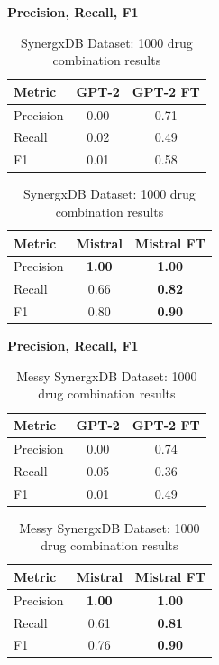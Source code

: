 \documentclass[11pt]{article}
\begin{document}
\begin{table}[ht]
\centering
\caption{SynergxDB Dataset: 1000 drug combination results}
\label{table:result}
\textbf{Precision, Recall, F1}
\par\medskip %
\begin{tabular}{|l|c|c|}
\hline
\textbf{Metric} & \textbf{GPT-2} & \textbf{GPT-2 FT} \\
\hline
Precision & 0.00 & 0.71 \\
Recall & 0.02 & 0.49 \\
F1 & 0.01 & 0.58 \\
\hline
\end{tabular}
\par\medskip %
\begin{tabular}{|l|c|c|}
\hline
\textbf{Metric} & \textbf{Mistral} & \textbf{Mistral FT} \\
\hline
Precision & \textbf{1.00} & \textbf{1.00} \\
Recall & 0.66 & \textbf{0.82} \\
F1 & 0.80 & \textbf{0.90} \\
\hline
\end{tabular}
\end{table}

\begin{table}[ht]
\centering
\caption{Messy SynergxDB Dataset: 1000 drug combination results}
\label{table:result}
\textbf{Precision, Recall, F1}
\par\medskip %
\begin{tabular}{|l|c|c|}
\hline
\textbf{Metric} & \textbf{GPT-2} & \textbf{GPT-2 FT} \\
\hline
Precision & 0.00 & 0.74 \\
Recall & 0.05 & 0.36 \\
F1 & 0.01 & 0.49 \\
\hline
\end{tabular}
\par\medskip %
\begin{tabular}{|l|c|c|}
\hline
\textbf{Metric} & \textbf{Mistral} & \textbf{Mistral FT} \\
\hline
Precision & \textbf{1.00} & \textbf{1.00} \\
Recall & 0.61 & \textbf{0.81} \\
F1 & 0.76 & \textbf{0.90} \\
\hline
\end{tabular}
\end{table}
\end{document}
